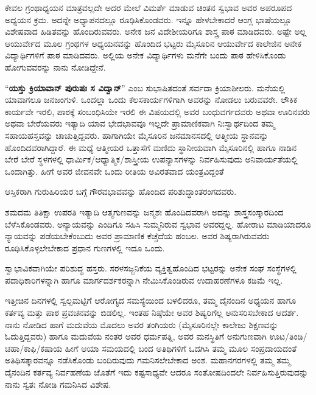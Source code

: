 {ಕೇವಲ ಗ್ರಂಥಾಧ್ಯಯನ ಮಾತ್ರವಲ್ಲದೇ ಅದರ ಮೇಲೆ ವಿಮರ್ಶೆ ಮಾಡುವ ಚಿಂತನ ಸ್ವಭಾವ ಅವರ ಅಪರೂಪದ ಅಧ್ಯಯನ ಕ್ರಮ. ಅದನ್ನೇ ಅಧ್ಯಾಪನದಲ್ಲೂ ರೂಢಿಸಿಕೊಂಡವರು. ಇನ್ನೂ ಹೇಳಬೇಕಾದರೆ ಆಂಗ್ಲ ಭಾಷೆಯಲ್ಲೂ ವಿಶೇಷವಾದ ಹಿಡಿತ\-ವನ್ನು ಹೊಂದಿರುವವರು. ಅನೇಕ ಜನ ವಿದೇಶೀಯರಿಗೂ ಶಾಸ್ತ್ರ ಪಾಠ ಮಾಡಿದವರು. ಅಷ್ಟೇ ಅಲ್ಲ ಆಯುರ್ವೇದ ಮೂಲ ಗ್ರಂಥಗಳ ಅಧ್ಯಯನವನ್ನು ಹೊಂದಿದ ಭಟ್ಟರು ಮೈಸೂರಿನ ಆಯುರ್ವೇದ ಕಾಲೇಜಿನ ಅನೇಕ ವಿದ್ಯಾರ್ಥಿಗಳಿಗೆ ಪಾಠ ಮಾಡಿದವರು. ಅಲ್ಲಿಯ ಅನೇಕ ವಿದ್ಯಾರ್ಥಿಗಳು ಮನೆಗೇ ಬಂದು ಪಾಠ ಹೇಳಿಸಿಕೊಂಡು ಹೋಗುವವರನ್ನು ನಾನು ನೋಡಿದ್ದೇನೆ.

“\textbf{ಯಸ್ತು ಕ್ರಿಯಾವಾನ್ ಪುರುಷಃ ಸ ವಿದ್ವಾನ್}” ಎಂಬ ಸುಭಾಷಿತದಂತೆ ಸರ್ವದಾ ಕ್ರಿಯಾಶೀಲರು. ಮನೆಯಲ್ಲಿ ಯಾವಾಗಲೂ ಜನಜಂಗುಳಿ. ಒಂದಲ್ಲಾ ಒಂದು ಕೆಲಸ\enginline{-}ಕಾರ್ಯಗಳಿಗಾಗಿ ಅವರನ್ನು ನೋಡಲು ಬರುವವರೇ. ಲೌಕಿಕ ಕಾರ್ಯವೇ ಇರಲಿ, ಪಾಠಕ್ಕೆ ಸಂಬಂಧಿಸಿಯೇ ಇರಲಿ ಈ ವಿಷಯದಲ್ಲಿ ಅವರ ಬಂಧುವರ್ಗದವರು ಅಥವಾ ಊರಿನವರು ಅಥವಾ ಬೇರೆಯವರು ಇತ್ಯಾದಿ ಯಾವ ಭೇದ\enginline{-}ಭಾವವೂ ಇಲ್ಲದೇ ಪ್ರಾಮಾಣಿಕವಾಗಿ ನಿಃಸ್ವಾರ್ಥದಿಂದ ತಮ್ಮ ಸಹಾಯಹಸ್ತವನ್ನು ಚಾಚುತ್ತಿದ್ದವರು. ಹಾಗಾಗಿಯೇ ಮೈಸೂರಿನ ಜನಮಾನಸದಲ್ಲಿ ಆತ್ಮೀಯ ಸ್ಥಾನವನ್ನು ಹೊಂದಿದವರಾಗಿದ್ದಾರೆ. ಈ ಮಧ್ಯೆ ಆತ್ಮೀಯರ ಒತ್ತಾಸೆಗೆ ಮಣಿದು ಸ್ಥಾನೀಯವಾಗಿ ಮೈಸೂರಿನಲ್ಲಿ ಹಾಗೂ ನಾಡಿನ ಬೇರೆ ಬೇರೆ ಸ್ಥಳಗಳಲ್ಲಿ ಧಾರ್ಮಿಕ/ಆಧ್ಯಾತ್ಮಿಕ/ಶಾಸ್ತ್ರೀಯ ಉಪನ್ಯಾಸಗಳನ್ನು ನಿರ್ವಹಿಸುವುದು ಅನಿವಾರ್ಯತೆಯಲ್ಲಿ ಒಂದಾಗಿತ್ತು. ಹೀಗೆ ಅವರ ಜೀವನವೇ ಒಂದು ರೀತಿಯ ಅವಿರತವಾದ ಯಂತ್ರವಿದ್ದಂತೆ
\vskip 2pt

ಆಸ್ತಿಕರಾಗಿ ಗುರು\enginline{-}ಹಿರಿಯರ ಬಗ್ಗೆ ಗೌರವಭಾವವನ್ನು ಹೊಂದಿದ ಪರಿಶುದ್ಧಾಂತ\-ರಂಗದವರು. 
\vskip 2pt

ಶಮ\enginline{-}ದಮ  \enginline{-}  ತಿತಿಕ್ಷಾ  \enginline{-}  ಉಪರತಿ ಇತ್ಯಾದಿ ಆತ್ಮಗುಣವನ್ನು ಜನ್ಮಶಃ ಹೊಂದಿದವ\-ರಾಗಿ ಅದನ್ನು ಶಾಸ್ತ್ರಸಂಸ್ಕಾರದಿಂದ ಬೆಳೆಸಿಕೊಂಡವರು. ಅನ್ಯಾಯವನ್ನು ಎಂದಿಗೂ ಸಹಿಸಿ ಸುಮ್ಮನಿರುವ ಸ್ವಭಾವ ಅವರದ್ದಲ್ಲ. ಹೋರಾಟ ಮಾಡಿಯಾದರೂ ನ್ಯಾಯವನ್ನು ಪಡೆಯ\-ಬೇಕೆಂಬುದು ಅವರ ಪ್ರಾಮಾಣಿಕ ಕೆಚ್ಚೆದೆಯ ಹಂಬಲ. ಅವರ ಶಿಷ್ಯರಾಗಿರು\-ವವರು ರೂಢಿಸಿಕೊಳ್ಳಲೇಬೇಕಾದ ಪ್ರಧಾನ ಗುಣಗಳಲ್ಲಿ ಇದೂ ಒಂದು.
\vskip 2pt

ಸ್ವಾಭಾವಿಕವಾಗಿಯೇ ಪರಿಶುದ್ಧ ಹಸ್ತರು. ಸರಳಸಜ್ಜನಿಕೆಯ ವ್ಯಕ್ತಿತ್ವಹೊಂದಿದ ಭಟ್ಟರನ್ನು ಅನೇಕ ಸಂಘ ಸಂಸ್ಥೆಗಳಲ್ಲಿ ಪದಾಧಿಕಾರಿಗಳನ್ನಾಗಿ ಹಾಗೂ ಮಾರ್ಗದರ್ಶಕರನ್ನಾಗಿ ನೇಮಿಸಿಕೊಂಡಿರುವ ಉದಾಹರಣೆಗಳೂ ಕಡಿಮೆ ಇಲ್ಲ.
\vskip 2pt

ಇತ್ತೀಚಿನ ದಿನಗಳಲ್ಲಿ ಸ್ವಲ್ಪಮಟ್ಟಿಗೆ ಆರೋಗ್ಯದ ಸಮಸ್ಯೆಯಿಂದ ಬಳಲಿದರೂ, ತಮ್ಮ ದೈನಂದಿನ ಅಧ್ಯಯನ ಹಾಗೂ ಕರ್ತವ್ಯ ಮತ್ತು ಪಾಠ ಪ್ರವಚನವನ್ನು ಬಿಡಲಿಲ್ಲ. ಇಂತಹ ನಿಷ್ಠೆಯೇ ಅವರ ಶಿಷ್ಯರಿಗೆಲ್ಲ ಅನುಸರಿಸಬೇಕಾದ ಆದರ್ಶ. ನಾನು ನೋಡಿದ ಹಾಗೆ ಮದುವೆಯ ಮೊದಲು ಅವರ ತಂಗಿಯರು (ಮೈಸೂರಿನಲ್ಲೇ ಕಾಲೇಜು ಶಿಕ್ಷಣ\-ವನ್ನು ಓದುತ್ತಿದ್ದವರು) ಹಾಗೂ ಮದುವೆಯ ನಂತರ ಅವರ ಧರ್ಮಪತ್ನಿ, ಅವರ ಮನಸ್ಥಿತಿಗೆ ಅನುಗುಣವಾಗಿ ಊಟ/ತಿಂಡಿ/ಚಹಾ/ಕಾಫಿ/ಕಷಾಯ ಹೀಗೆ ಆಯಾ ಸಮಯದಲ್ಲಿ ಬಂದ ಅತಿಥಿಗಳಿಗೆ ಒದಗಿಸಿ ತಮ್ಮ ಮೂಲ ಸಂಪ್ರದಾಯದಂತೆ ಅತಿಥಿಸತ್ಕಾರವನ್ನೂ ನಡೆಸಿಕೊಂಡು ಬಂದಿರುವುದು ಗಮನಿಸಲೇಬೇಕಾದ ಅಂಶ. ಮಹಾನಗರಗಳಲ್ಲಿ ತಮ್ಮ ತಮ್ಮ ದೈನಂದಿನ ಕರ್ತವ್ಯ ನಿರ್ವಹಣೆಯ ಜೊತೆಗೆ ಇದು ಕಷ್ಟಸಾಧ್ಯವೇ ಆದರೂ ಸಂತೋಷದಿಂದಲೇ ನಿರ್ವಹಿಸುತ್ತಿರುವುದನ್ನು ನಾನು ಸ್ವತಃ ನೋಡಿ ಗಮನಿಸಿದ ವಿಶೇಷ.

}
